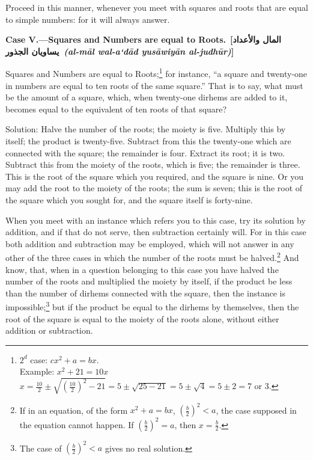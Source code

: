 Proceed in this manner, whenever you meet with squares and roots that are equal to simple numbers: for it will always answer.

\vspace{0.3cm}
\noindent\textbf{Case V.---Squares and Numbers are equal to Roots.}\
\hfill\textbf{[\arabicfont\beginR المال والأعداد يساويان الجذور\endR\ \textit{(al-m\=al wal-a`d\=ad yus\=awiy\=an al-judh\=ur)}]}

Squares and Numbers are equal to Roots;\footnote{$2^{d}$ case: $cx^2 + a = bx$.\\Example: $x^2 + 21 = 10x$\\$x = \frac{10}{2} \pm \sqrt{(\frac{10}{2})^2 - 21} = 5 \pm \sqrt{25 - 21} = 5 \pm \sqrt{4} = 5 \pm 2 = 7$ or $3$.} for instance, ``a square and twenty-one in numbers are equal to ten roots of the same square.'' That is to say, what must be the amount of a square, which, when twenty-one dirhems are added to it, becomes equal to the equivalent of ten roots of that square?

Solution: Halve the number of the roots; the moiety is five. Multiply this by itself; the product is twenty-five. Subtract from this the twenty-one which are connected with the square; the remainder is four. Extract its root; it is two. Subtract this from the moiety of the roots, which is five; the remainder is three. This is the root of the square which you required, and the square is nine. Or you may add the root to the moiety of the roots; the sum is seven; this is the root of the square which you sought for, and the square itself is forty-nine.

When you meet with an instance which refers you to this case, try its solution by addition, and if that do not serve, then subtraction certainly will. For in this case both addition and subtraction may be employed, which will not answer in any other of the three cases in which the number of the roots must be halved.\footnote{If in an equation, of the form $x^2 + a = bx$, $(\frac{b}{2})^2 < a$, the case supposed in the equation cannot happen. If $(\frac{b}{2})^2 = a$, then $x = \frac{b}{2}$.} And know, that, when in a question belonging to this case you have halved the number of the roots and multiplied the moiety by itself, if the product be less than the number of dirhems connected with the square, then the instance is impossible;\footnote{The case of $(\frac{b}{2})^2 < a$ gives no real solution.} but if the product be equal to the dirhems by themselves, then the root of the square is equal to the moiety of the roots alone, without either addition or subtraction.

